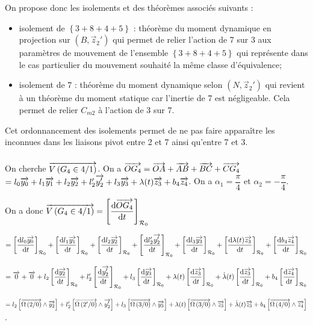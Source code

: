 \documentclass[10pt,fleqn]{article} %
\begin{document}
On propose donc les isolements et des théorèmes associés suivants : 
\begin{itemize}
\item isolement de $\left\{3+8+4+5\right\}$ : théorème du moment dynamique en projection sur $\left(B,\overrightarrow{z}_2'\right)$ qui permet de relier l'action de 7 sur 3 aux paramètres de mouvement de l'ensemble $\left\{3+8+4+5\right\}$ qui représente dans le cas particulier du mouvement souhaité la même classe d'équivalence;
\item isolement de $7$ : théorème du moment dynamique selon $\left(N,\overrightarrow{z}_2'\right)$ qui revient à un théorème du moment statique car l'inertie de 7 est négligeable. Cela permet de relier $C_{m2}$ à l'action de 3 sur 7.
\end{itemize}
Cet ordonnancement des isolements permet de ne pas faire apparaître les inconnues dans les liaisons pivot entre 2 et 7 ainsi qu'entre 7 et 3. 
\subparagraph{}%
On cherche $\overrightarrow{V\left( {G_4} \in {4}/{1}\right)}$. On a $\overrightarrow{OG_4}=\overrightarrow{OA}+\overrightarrow{AB}+\overrightarrow{BC}+\overrightarrow{CG_4}$ $=l_0\overrightarrow{y_0}+l_1\overrightarrow{y_1}+l_2\overrightarrow{y_2}+l_2'\overrightarrow{y_2'}+l_3\overrightarrow{y_3}+\lambda(t)\overrightarrow{z_3}+b_4\overrightarrow{z_4}$.
On a $\alpha_1=\dfrac{\pi}{4}$ et $\alpha_2=-\dfrac{\pi}{4}$.

On a donc $\overrightarrow{V\left( {G_4} \in {4}/{1}\right)}= \left[\dfrac{\text{d} \overrightarrow{OG_4}}{\text{d} t}\right]_{\mathcal{R}_{0}} $ 

$= 
\left[\dfrac{\text{d} l_0\overrightarrow{y_0}}{\text{d} t}\right]_{\mathcal{R}_{0}}+
\left[\dfrac{\text{d} l_1\overrightarrow{y_1}}{\text{d} t}\right]_{\mathcal{R}_{0}}+
\left[\dfrac{\text{d} l_2\overrightarrow{y_2}}{\text{d} t}\right]_{\mathcal{R}_{0}}+
\left[\dfrac{\text{d} l_2'\overrightarrow{y_2'}}{\text{d} t}\right]_{\mathcal{R}_{0}}+
\left[\dfrac{\text{d} l_3\overrightarrow{y_3}}{\text{d} t}\right]_{\mathcal{R}_{0}}+
\left[\dfrac{\text{d} \lambda(t)\overrightarrow{z_3}}{\text{d} t}\right]_{\mathcal{R}_{0}}+
\left[\dfrac{\text{d} b_4\overrightarrow{z_4}}{\text{d} t}\right]_{\mathcal{R}_{0}}$

$= 
\overrightarrow{0}+
\overrightarrow{0}+
l_2\left[\dfrac{\text{d} \overrightarrow{y_2}}{\text{d} t}\right]_{\mathcal{R}_{0}}+
l_2'\left[\dfrac{\text{d} \overrightarrow{y_2'}}{\text{d} t}\right]_{\mathcal{R}_{0}}+
l_3\left[\dfrac{\text{d} \overrightarrow{y_3}}{\text{d} t}\right]_{\mathcal{R}_{0}}+
\lambda(t)\left[\dfrac{\text{d} \overrightarrow{z_3}}{\text{d} t}\right]_{\mathcal{R}_{0}}+
\dot{\lambda}(t)\left[\dfrac{\text{d} \overrightarrow{z_3}}{\text{d} t}\right]_{\mathcal{R}_{0}}+
b_4\left[\dfrac{\text{d} \overrightarrow{z_4}}{\text{d} t}\right]_{\mathcal{R}_{0}}$

$= 
l_2\left[ \overrightarrow{\Omega\left( {2}/{0}\right)} \wedge \overrightarrow{y_2} \right]+
l_2'\left[ \overrightarrow{\Omega\left( {2'}/{0}\right)} \wedge \overrightarrow{y_2'} \right]+
l_3\left[ \overrightarrow{\Omega\left( {3}/{0}\right)} \wedge \overrightarrow{y_3} \right]+
\lambda(t)\left[ \overrightarrow{\Omega\left( {3}/{0}\right)} \wedge \overrightarrow{z_3} \right]+
\dot{\lambda}(t)\overrightarrow{z_3}+
b_4\left[ \overrightarrow{\Omega\left( {4}/{0}\right)} \wedge \overrightarrow{z_4} \right]$. 
\end{document}
